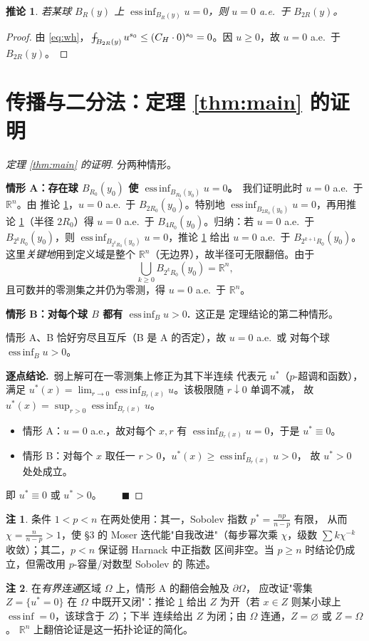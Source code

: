 \documentclass[11pt]{ctexart}
\newcommand{\fint}{\,\rlap{$-$}\!\int}
\newcommand{\R}{\mathbb{R}}
\DeclareMathOperator*{\essinf}{ess\,inf}
\theoremstyle{plain}
\newtheorem{corollary}{推论}
\theoremstyle{definition}
\newtheorem{remark}{注}
\begin{document}
\begin{corollary}\label{cor:zero}
若某球 $B_R(y)$ 上 $\essinf_{B_R(y)}u=0$，则 $u=0$ a.e.\ 于 $B_{2R}(y)$。
\end{corollary}
\begin{proof}
由 \eqref{eq:wh}，$\fint_{B_{2R}(y)}u^{s_0}\le(C_H\cdot0)^{s_0}=0$。因
$u\ge0$，故 $u=0$ a.e.\ 于 $B_{2R}(y)$。
\end{proof}

\section{传播与二分法：定理 \ref{thm:main} 的证明}

\begin{proof}[定理 \ref{thm:main} 的证明]
分两种情形。

\medskip\noindent\textbf{情形 A：存在球 $B_{R_0}(y_0)$ 使
$\essinf_{B_{R_0}(y_0)}u=0$。}\ 我们证明此时 $u=0$ a.e.\ 于 $\R^n$。由
推论 \ref{cor:zero}，$u=0$ a.e.\ 于 $B_{2R_0}(y_0)$。特别地
$\essinf_{B_{2R_0}(y_0)}u=0$，再用推论 \ref{cor:zero}（半径 $2R_0$）得
$u=0$ a.e.\ 于 $B_{4R_0}(y_0)$。归纳：若 $u=0$ a.e.\ 于
$B_{2^kR_0}(y_0)$，则 $\essinf_{B_{2^kR_0}(y_0)}u=0$，推论 \ref{cor:zero}
给出 $u=0$ a.e.\ 于 $B_{2^{k+1}R_0}(y_0)$。这里\emph{关键地}用到定义域是整个
$\R^n$（无边界），故半径可无限翻倍。由于
\[
\bigcup_{k\ge0}B_{2^kR_0}(y_0)=\R^n,
\]
且可数并的零测集之并仍为零测，得 $u=0$ a.e.\ 于 $\R^n$。

\medskip\noindent\textbf{情形 B：对每个球 $B$ 都有 $\essinf_B u>0$.}\ 这正是
定理结论的第二种情形。

\medskip 情形 A、B 恰好穷尽且互斥（B 是 A 的否定），故 $u=0$ a.e.\ 或
对每个球 $\essinf_B u>0$。

\medskip\noindent\textbf{逐点结论.}\ 弱上解可在一零测集上修正为其下半连续
代表元 $u^*$（$p$-超调和函数），满足
$u^*(x)=\lim_{r\to0}\essinf_{B_r(x)}u$。该极限随 $r\downarrow0$ 单调不减，
故 $u^*(x)=\sup_{r>0}\essinf_{B_r(x)}u$。
\begin{itemize}[leftmargin=1.4em]
\item 情形 A：$u=0$ a.e.，故对每个 $x,r$ 有 $\essinf_{B_r(x)}u=0$，于是
$u^*\equiv0$。
\item 情形 B：对每个 $x$ 取任一 $r>0$，$u^*(x)\ge\essinf_{B_r(x)}u>0$，
故 $u^*>0$ 处处成立。
\end{itemize}
即 $u^*\equiv0$ 或 $u^*>0$。$\qquad\blacksquare$
\end{proof}

\begin{remark}
条件 $1<p<n$ 在两处使用：其一，Sobolev 指数 $p^*=\frac{np}{n-p}$ 有限，
从而 $\chi=\frac{n}{n-p}>1$，使 §3 的 Moser 迭代能"自我改进"（每步幂次乘
$\chi$，级数 $\sum k\chi^{-k}$ 收敛）；其二，$p<n$ 保证弱 Harnack 中正指数
区间非空。当 $p\ge n$ 时结论仍成立，但需改用 $p$-容量/对数型 Sobolev 的
陈述。
\end{remark}

\begin{remark}
在\emph{有界连通}区域 $\Omega$ 上，情形 A 的翻倍会触及 $\partial\Omega$，
应改证"零集 $Z=\{u^*=0\}$ 在 $\Omega$ 中既开又闭"：推论 \ref{cor:zero}
给出 $Z$ 为开（若 $x\in Z$ 则某小球上 $\essinf=0$，该球含于 $Z$）；下半
连续给出 $Z$ 为闭；由 $\Omega$ 连通，$Z=\varnothing$ 或 $Z=\Omega$。
$\R^n$ 上翻倍论证是这一拓扑论证的简化。
\end{remark}
\end{document}
